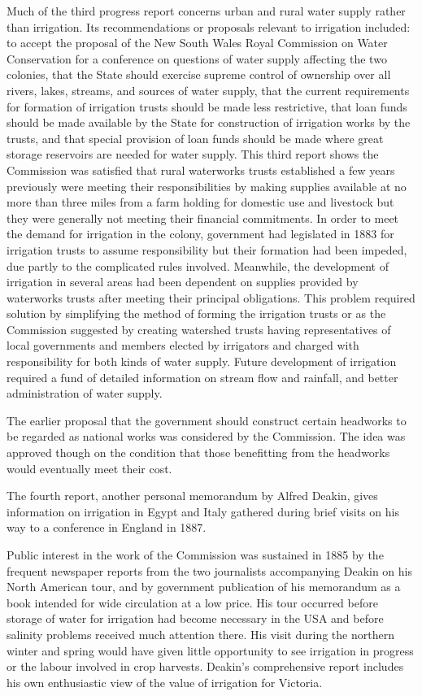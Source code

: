 Much of the third progress report concerns urban and rural water
supply rather than irrigation.  Its recommendations or proposals
relevant to irrigation included: to accept the proposal of the New
South Wales Royal Commission on Water Conservation for a conference on
questions of water supply affecting the two colonies, that the State
should exercise supreme control of ownership over all rivers, lakes,
streams, and sources of water supply, that the current requirements
for formation of irrigation trusts should be made less restrictive,
that loan funds should be made available by the State for construction
of irrigation works by the trusts, and that special provision of loan
funds should be made where great storage reservoirs are needed for
water supply.  This third report shows the Commission was satisfied
that rural waterworks trusts established a few years previously were
meeting their responsibilities by making supplies available at no more
than three miles from a farm holding for domestic use and livestock
but they were generally not meeting their financial commitments.  In
order to meet the demand for irrigation in the colony, government had
legislated in 1883 for irrigation trusts to assume responsibility but
their formation had been impeded, due partly to the complicated rules
involved.  Meanwhile, the development of irrigation in several areas
had been dependent on supplies provided by waterworks trusts after
meeting their principal obligations.  This problem required solution
by simplifying the method of forming the irrigation trusts or as the
Commission suggested by creating watershed trusts having
representatives of local governments and members elected by irrigators
and charged with responsibility for both kinds of water supply.
Future development of irrigation required a fund of detailed
information on stream flow and rainfall, and better administration of
water supply.

The earlier proposal that the government should construct certain
headworks to be regarded as national works was considered by the
Commission.  The idea was approved though on the condition that those
benefitting from the headworks would eventually meet their cost.

The fourth report, another personal memorandum by Alfred Deakin, gives
information on irrigation in Egypt and Italy gathered during brief
visits on his way to a conference in England in 1887.

Public interest in the work of the Commission was sustained in 1885 by
the frequent newspaper reports from the two journalists accompanying
Deakin on his North American tour, and by government publication of
his memorandum as a book intended for wide circulation at a low price.
His tour occurred before storage of water for irrigation had become
necessary in the USA and before salinity problems received much
attention there.  His visit during the northern winter and spring
would have given little opportunity to see irrigation in progress or
the labour involved in crop harvests.  Deakin's comprehensive report
includes his own enthusiastic view of the value of irrigation for
Victoria.

